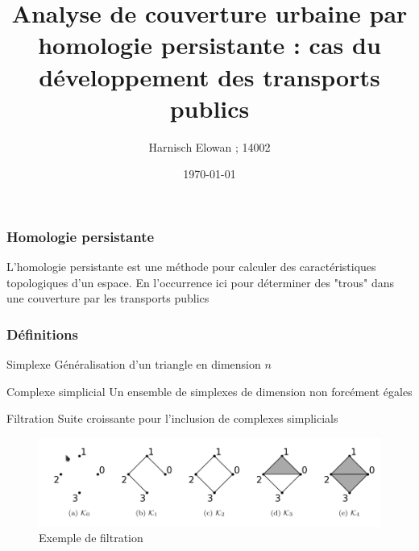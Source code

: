 \documentclass{beamer}
\begin{document}
\title{Analyse de couverture urbaine par homologie persistante : cas du 
    développement des transports publics}
\author{Harnisch Elowan ; 14002}
\date{\today}

\maketitle

\begin{frame}
    \frametitle{Homologie persistante}
    L'homologie persistante est une méthode pour calculer des caractéristiques
    topologiques d'un espace. En l'occurrence ici pour déterminer des "trous" dans
    une couverture par les transports publics
    
\end{frame}

\begin{frame}
    \frametitle{Définitions}
    \begin{block}{Simplexe}
        Généralisation d'un triangle en dimension $n$
    \end{block}

    \begin{block}{Complexe simplicial}
        Un ensemble de simplexes de dimension non forcément égales
    \end{block}

    \begin{block}{Filtration}
        Suite croissante pour l'inclusion de complexes simplicials
    \end{block}

    \begin{figure}
        \includegraphics[width=\textwidth]{filtration}
        \centering
        \caption{Exemple de filtration}
    \end{figure}
    
\end{frame}
\end{document}
